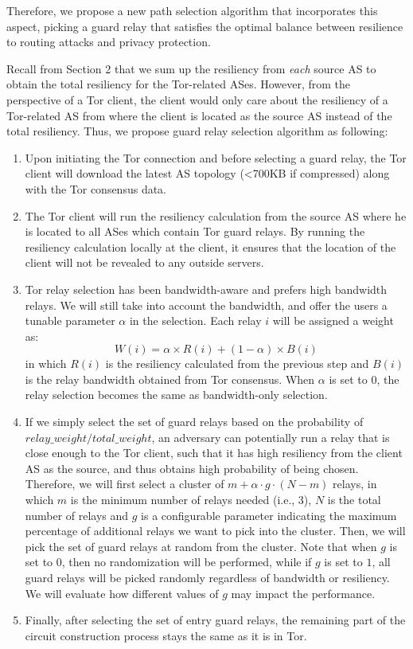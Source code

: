 Therefore, we propose a new path selection algorithm that incorporates this aspect, picking a guard relay that satisfies the optimal balance between resilience to routing attacks and privacy protection. 

Recall from Section 2 that we sum up the resiliency from \emph{each} source AS to obtain the total resiliency for the Tor-related ASes. However, from the perspective of a Tor client, the client would only care about the resiliency of a Tor-related AS from where the client is located as the source AS instead of the total resiliency. Thus, we propose guard relay selection algorithm as following:

\begin{enumerate}
\item Upon initiating the Tor connection and before selecting a guard relay, the Tor client will download the latest AS topology (<700KB if compressed) along with the Tor consensus data.
\item The Tor client will run the resiliency calculation from the source AS where he is located to all ASes which contain Tor guard relays. By running the resiliency calculation locally at the client, it ensures that the location of the client will not be revealed to any outside servers. 
\item Tor relay selection has been bandwidth-aware and prefers high bandwidth relays. We will still take into account the bandwidth, and offer the users a tunable parameter $\alpha$ in the selection. Each relay $i$ will be assigned a weight as:
\begin{equation*}
W(i) = \alpha \times R(i) + (1 - \alpha) \times B(i)
\end{equation*}
in which $R(i)$ is the resiliency calculated from the previous step and $B(i)$ is the relay bandwidth obtained from Tor consensus. When $\alpha$ is set to $0$, the relay selection becomes the same as bandwidth-only selection. 
\item If we simply select the set of guard relays based on the probability of $relay\_weight/total\_weight$, an adversary can potentially run a relay that is close enough to the Tor client, such that it has high resiliency from the client AS as the source, and thus obtains high probability of being chosen. Therefore, we will first select a cluster of $m + \alpha \cdot g \cdot (N - m)$ relays, in which $m$ is the minimum number of relays needed (i.e., 3), $N$ is the total number of relays and $g$ is a configurable parameter indicating the maximum percentage of additional relays we want to pick into the cluster. Then, we will pick the set of guard relays at random from the cluster. Note that when $g$ is set to $0$, then no randomization will be performed, while if $g$ is set to $1$, all guard relays will be picked randomly regardless of bandwidth or resiliency. We will evaluate how different values of $g$ may impact the performance. 
\item Finally, after selecting the set of entry guard relays, the remaining part of the circuit construction process stays the same as it is in Tor. 
\end{enumerate}


